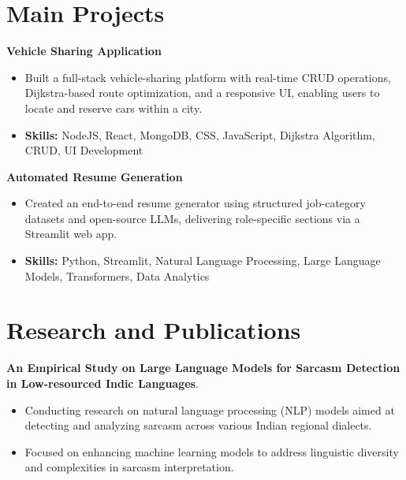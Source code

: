 \documentclass[a4paper,11pt]{article}
\begin{document}
\section{\textbf{Main Projects}}

\vspace{1mm}
  \textbf{Vehicle Sharing Application  }
\vspace{-1.5mm} %
\begin{itemize}
  \item Built a full-stack vehicle-sharing platform with real-time CRUD operations, Dijkstra-based route optimization, and a responsive UI, enabling users to locate and reserve cars within a city.
\vspace{-3mm}
  \item \textbf{Skills:} NodeJS, React, MongoDB, CSS, JavaScript, Dijkstra Algorithm, CRUD, UI Development
\end{itemize}


\vspace{1mm}
   \textbf{Automated Resume Generation }
\vspace{-1.5mm} %
\begin{itemize}
  \item Created an end-to-end resume generator using structured job-category datasets and open-source LLMs, delivering role-specific sections via a Streamlit web app.
\vspace{-3mm}
  \item \textbf{Skills:} Python, Streamlit, Natural Language Processing, Large Language Models, Transformers, Data Analytics
\end{itemize}



\section{\textbf{Research and Publications} \hfill }
\vspace{1mm}
  \textbf{An Empirical Study on Large Language Models for Sarcasm Detection in Low-resourced Indic Languages}.
\vspace{-1mm} %
\begin{itemize}
  \item Conducting research on natural language processing (NLP) models aimed at detecting and analyzing sarcasm across various Indian regional dialects.
\vspace{-3mm}
  \item Focused on enhancing machine learning models to address linguistic diversity and complexities in sarcasm interpretation.
\end{itemize}
\end{document}
